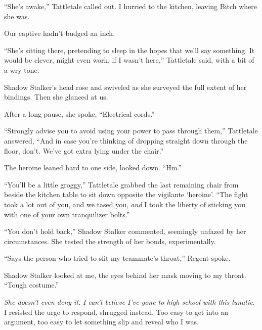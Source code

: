 ``She's awake,'' Tattletale called out.  I hurried to the kitchen, leaving Bitch where she was.



Our captive hadn't budged an inch.



``She's sitting there, pretending to sleep in the hopes that we'll say something.  It would be clever, might even work, if I wasn't here,'' Tattletale said, with a bit of a wry tone.



Shadow Stalker's head rose and swiveled as she surveyed the full extent of her bindings.  Then she glanced at us.



After a long pause, she spoke, ``Electrical cords.''



``Strongly advise you to avoid using your power to pass through them,'' Tattletale answered, ``And in case you're thinking of dropping straight down through the floor, don't.  We've got extra lying under the chair.''



The heroine leaned hard to one side, looked down.  ``Hm.''



``You'll be a little groggy,'' Tattletale grabbed the last remaining chair from beside the kitchen table to sit down opposite the vigilante `heroine'.  ``The fight took a lot out of you, and we tased you, \emph{and} I took the liberty of sticking you with one of your own tranquilizer bolts.''



``You don't hold back,'' Shadow Stalker commented, seemingly unfazed by her circumstances.  She tested the strength of her bonds, experimentally.



``Says the person who tried to slit my teammate's throat,'' Regent spoke.



Shadow Stalker looked at me, the eyes behind her mask moving to my throat.  ``Tough costume.''



\emph{She doesn't even deny it.  }\emph{I can't believe I've gone to high school with this lunatic}.  I resisted the urge to respond, shrugged instead.  Too easy to get into an argument, too easy to let something slip and reveal who I was.



